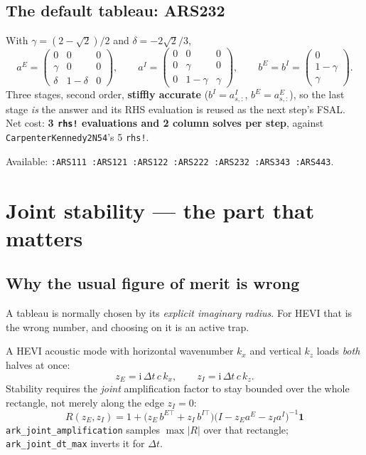 \documentclass[11pt,a4paper]{article}
\begin{document}
\subsection{The default tableau: ARS232}
With $\gamma=(2-\sqrt2)/2$ and $\delta=-2\sqrt2/3$,
\begin{equation}
a^E=\begin{pmatrix}0&0&0\\ \gamma&0&0\\ \delta&1-\delta&0\end{pmatrix},
\qquad
a^I=\begin{pmatrix}0&0&0\\ 0&\gamma&0\\ 0&1-\gamma&\gamma\end{pmatrix},
\qquad
b^E=b^I=\begin{pmatrix}0\\ 1-\gamma\\ \gamma\end{pmatrix}.
\end{equation}
Three stages, second order, \textbf{stiffly accurate}
($b^I=a^I_{s,:}$, $b^E=a^E_{s,:}$), so the last stage \emph{is} the answer and
its RHS evaluation is reused as the next step's FSAL. Net cost:
\textbf{3 \texttt{rhs!} evaluations and 2 column solves per step}, against
\texttt{CarpenterKennedy2N54}'s 5 \texttt{rhs!}.

Available: \texttt{:ARS111 :ARS121 :ARS122 :ARS222 :ARS232 :ARS343 :ARS443}.

\section{Joint stability --- the part that matters}

\subsection{Why the usual figure of merit is wrong}
A tableau is normally chosen by its \emph{explicit imaginary radius}. For HEVI
that is the wrong number, and choosing on it is an active trap.

A HEVI acoustic mode with horizontal wavenumber $k_x$ and vertical $k_z$ loads
\emph{both} halves at once:
\begin{equation}
z_E = \mathrm{i}\,\Delta t\,c\,k_x, \qquad
z_I = \mathrm{i}\,\Delta t\,c\,k_z .
\end{equation}
Stability requires the \emph{joint} amplification factor to stay bounded over
the whole rectangle, not merely along the edge $z_I=0$:
\begin{equation}
\boxed{\;
R(z_E,z_I)=1+\big(z_E\,b^{E\top}+z_I\,b^{I\top}\big)
\big(I-z_E a^E-z_I a^I\big)^{-1}\bm{1}\;}
\label{eq:joint}
\end{equation}
\texttt{ark\_joint\_amplification} samples $\max|R|$ over that rectangle;
\texttt{ark\_joint\_dt\_max} inverts it for $\Delta t$.
\end{document}
